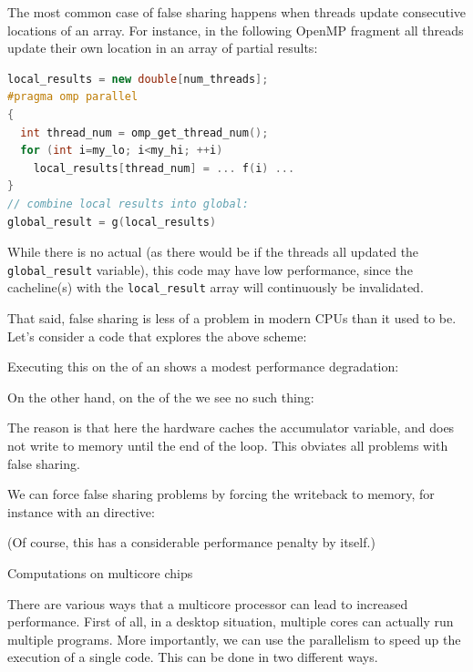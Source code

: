 The most common case of false sharing happens when
threads update consecutive locations of an array. For instance, in the
following OpenMP fragment all threads update their own location in an
array of partial results:
\begin{lstlisting}[language=cpp]
  local_results = new double[num_threads];
#pragma omp parallel
{
  int thread_num = omp_get_thread_num();
  for (int i=my_lo; i<my_hi; ++i)
    local_results[thread_num] = ... f(i) ...
}
// combine local results into global:
global_result = g(local_results)
\end{lstlisting}
While there is no actual  (as there would be
if the threads all updated the \lstinline{global_result} variable),
this code may have low performance, since the cacheline(s) with the
\lstinline{local_result} array will continuously be invalidated.

That said, false sharing is less of a problem in modern CPUs
than it used to be.
Let's consider a code that explores the above scheme:
%

Executing this on the 
of an 
shows a modest performance degradation:
%


On the other hand, on the 
of the  we see no such thing:
%


The reason is that here the hardware caches the accumulator variable,
and does not write to memory until the end of the loop.
This obviates all problems with false sharing.

We can force false sharing problems by forcing the writeback to memory,
for instance with an  directive:
%


(Of course, this has a considerable performance penalty by itself.)


 {Computations on multicore chips}

There are various ways that a multicore processor can lead to
increased performance. First of all, in a desktop situation, multiple
cores can actually run multiple programs. More importantly, we can use
the parallelism to speed up the execution of a single code. This can
be done in two different ways.

